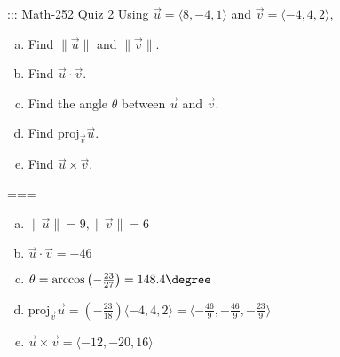 ::: Math-252 Quiz 2
Using \(\vec u=\langle 8,-4,1\rangle\) and \(\vec v=\langle -4,4,2\rangle\),
\begin{enumerate}[a.]
  \item Find \(\|\vec u\|\) and \(\|\vec v\|\).
  \item Find \(\vec u\cdot\vec v\).
  \item Find the angle \(\theta\) between \(\vec u\) and \(\vec v\).
  \item Find \(\text{proj}_{\vec v}\vec u\).
  \item Find \(\vec u\times\vec v\).
\end{enumerate}
===
\begin{enumerate}[a.]
  \item \(\|\vec u\|=9,\|\vec v\|=6\)
  \item \(\vec u\cdot\vec v=-46\)
  \item \(\theta=\arccos\left(-\frac{23}{27}\right)=148.4\degree\)
  \item \(\text{proj}_{\vec v}\vec u=\left(-\frac{23}{18}\right)\langle-4,4,2\rangle=\langle-\frac{46}{9},-\frac{46}{9},-\frac{23}{9}\rangle\)
  \item \(\vec u\times\vec v=\langle -12,-20,16\rangle\)
\end{enumerate}
